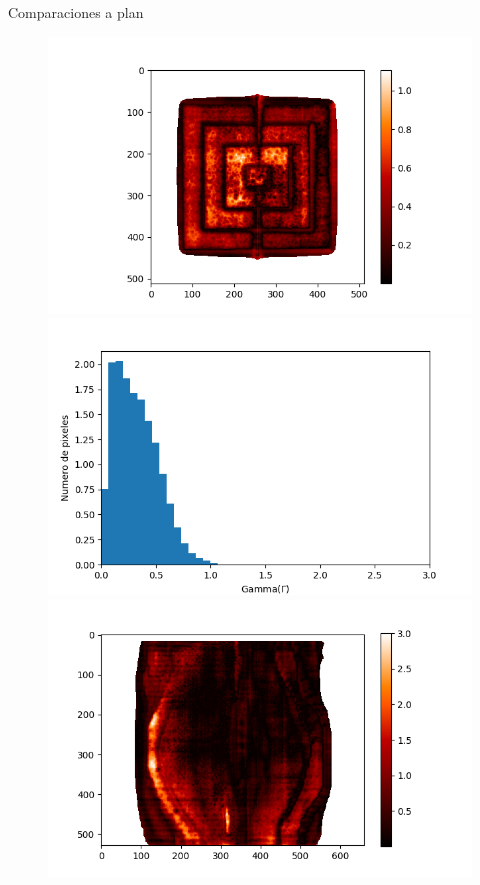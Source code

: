 \documentclass[12pt]{beamer}
\begin{document}
\begin{frame}{Comparaciones a plan}
\begin{figure}[htp]%
	\centering
	\begin{minipage}{0.45\textwidth}
		\includegraphics[width=\textwidth]{images/gammaPiramideCalor.png}
	\end{minipage}\hfill
	\begin{minipage}{0.45\textwidth}
		\includegraphics[width=\textwidth]{images/histogramaGammaPiramide.png}
	\end{minipage}\par
	\begin{minipage}{0.45\textwidth}
		\includegraphics[width=\textwidth]{images/gammaMama.png}

\end{minipage}
\end{figure}
\end{frame}
\end{document}
